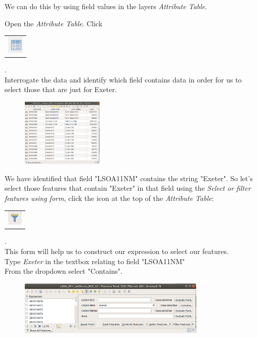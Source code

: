 We can do this by using field values in the layers \textit{Attribute Table}.

Open the \textit{Attribute Table}. Click	\begin{tabular}{@{}c@{}}\includegraphics[width=4ex]{images/attribute_table_icon.png}\end{tabular}.\\

Interrogate the data and identify which field contains data in order for us to select those that are just for Exeter.

\begin{figure}[!h]
	\centering
	\includegraphics[width=0.35\textwidth]{images/shapefile_attribute_table.png}
	\caption{}
	\label{ft_fig_firstfig3}
\end{figure}

We have identified that field "LSOA11NM" contains the string "Exeter". So let's select those features that contain "Exeter" in that field using the \textit{Select or filter features using form}, click the icon at the top of the \textit{Attribute Table}: 
\begin{tabular}{@{}c@{}}\includegraphics[width=4ex]{images/select_features_form_icon.png}\end{tabular}.\\

This form will help us to construct our expression to select our features.\\

Type \textit{Exeter} in the textbox relating to field "LSOA11NM"\\
From the dropdown select "Contains".\\

\begin{figure}[!h]
	\centering
	\includegraphics[width=0.8\textwidth]{images/select_filter_features_form.png}
	\caption{}
	\label{ft_fig_firstfig3}
\end{figure}

